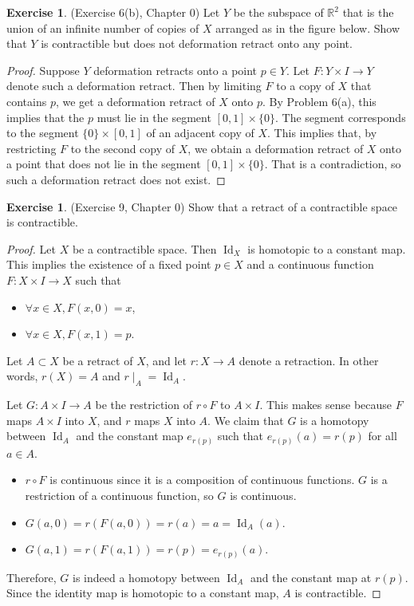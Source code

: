 \documentclass[12pt, psamsfonts]{amsart}
\theoremstyle{definition}
\newtheorem{exer}[thm]{Exercise}
\theoremstyle{remark}
\DeclareMathOperator{\Id}{Id}
\numberwithin{equation}{section}
\begin{document}
\begin{exer}{(Exercise 6(b), Chapter 0)}
  Let $Y$ be the subspace of $\mathbb{R}^2$ that is the union of an infinite number of copies of $X$ arranged as in the figure below.
  Show that $Y$ is contractible but does not deformation retract onto any point.
\end{exer}

\begin{proof}
  Suppose $Y$ deformation retracts onto a point $p \in Y$.
  Let $F: Y \times I \rightarrow Y$ denote such a deformation retract.
  Then by limiting $F$ to a copy of $X$ that contains $p$, we get a deformation retract of $X$ onto $p$.
  By Problem 6(a), this implies that the $p$ must lie in the segment $[0, 1] \times \{ 0 \}$.
  The segment corresponds to the segment $\{ 0 \} \times [0, 1]$ of an adjacent copy of $X$.
  This implies that, by restricting $F$ to the second copy of $X$, we obtain a deformation retract of $X$ onto a point that does not lie in the segment $[0, 1] \times \{ 0 \}$.
  That is a contradiction, so such a deformation retract does not exist.
\end{proof}

\begin{exer}{(Exercise 9, Chapter 0)}
  Show that a retract of a contractible space is contractible.
\end{exer}

\begin{proof}
  Let $X$ be a contractible space.
  Then $\Id_X$ is homotopic to a constant map.
  This implies the existence of a fixed point $p \in X$ and a continuous function $F: X \times I \rightarrow X$ such that
  \begin{itemize}
    \item
      $\forall x \in X, F(x, 0) = x$,
    \item
      $\forall x \in X, F(x, 1) = p$.
  \end{itemize}
  Let $A \subset X$ be a retract of $X$, and let $r: X \rightarrow A$ denote a retraction.
  In other words, $r(X) = A$ and $r \mid_A = \Id_A$.

  Let $G: A \times I \rightarrow A$ be the restriction of $r \circ F$ to $A \times I$.
  This makes sense because $F$ maps $A \times I$ into $X$, and $r$ maps $X$ into $A$.
  We claim that $G$ is a homotopy between $\Id_A$ and the constant map $e_{r(p)}$ such that $e_{r(p)}(a) = r(p)$ for all $a \in A$.

  \begin{itemize}
    \item
      $r \circ F$ is continuous since it is a composition of continuous functions.
      $G$ is a restriction of a continuous function, so $G$ is continuous.
    \item
      $G(a, 0) = r(F(a, 0)) = r(a) = a = \Id_A(a)$.
    \item
      $G(a, 1) = r(F(a, 1)) = r(p) = e_{r(p)}(a)$.
  \end{itemize}

  Therefore, $G$ is indeed a homotopy between $\Id_A$ and the constant map at $r(p)$.
  Since the identity map is homotopic to a constant map, $A$ is contractible.
\end{proof}
\end{document}
